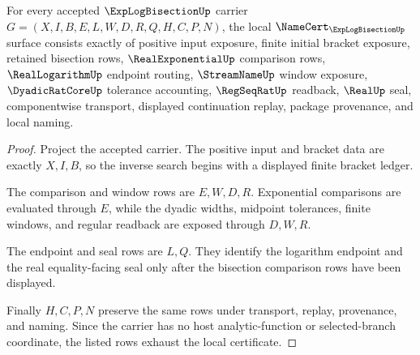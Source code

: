 \begin{theorem}
\label{thm:exp-log-bisection-namecert-obligations}
For every accepted $\ExpLogBisectionUp$ carrier $G=(X,I,B,E,L,W,D,R,Q,H,C,P,N)$, the local $\NameCert_{\ExpLogBisectionUp}$ surface consists exactly of positive input exposure, finite initial bracket exposure, retained bisection rows, $\RealExponentialUp$ comparison rows, $\RealLogarithmUp$ endpoint routing, $\StreamNameUp$ window exposure, $\DyadicRatCoreUp$ tolerance accounting, $\RegSeqRatUp$ readback, $\RealUp$ seal, componentwise transport, displayed continuation replay, package provenance, and local naming.
\end{theorem}
\begin{proof}
Project the accepted carrier. The positive input and bracket data are exactly $X,I,B$, so the inverse search begins with a displayed finite bracket ledger.

The comparison and window rows are $E,W,D,R$. Exponential comparisons are evaluated through $E$, while the dyadic widths, midpoint tolerances, finite windows, and regular readback are exposed through $D,W,R$.

The endpoint and seal rows are $L,Q$. They identify the logarithm endpoint and the real equality-facing seal only after the bisection comparison rows have been displayed.

Finally $H,C,P,N$ preserve the same rows under transport, replay, provenance, and naming. Since the carrier has no host analytic-function or selected-branch coordinate, the listed rows exhaust the local certificate.
\end{proof}

